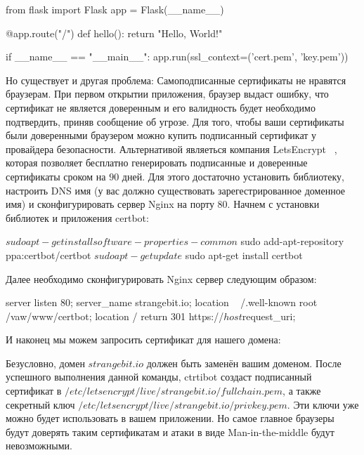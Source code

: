 \begin{python}
from flask import Flask
app = Flask(__name__)

@app.route("/")
def hello():
    return "Hello, World!"

if __name__ == "__main__":
    app.run(ssl_context=('cert.pem', 'key.pem'))
\end{python}

Но существует и другая проблема: Самоподписанные сертификаты не нравятся браузерам.
При первом открытии приложения, браузер выдаст ошибку, что сертификат не является
доверенным и его валидность будет необходимо подтвердить, приняв сообщение об угрозе.
Для того, чтобы ваши сертификаты были доверенными браузером можно купить подписанный 
сертификат у провайдера безопасности. Альтернативой являеться компания LetsEncrypt
~\cite{letsencrypt}, которая позволяет бесплатно генерировать подписанные и доверенные сертификаты
сроком на $90$ дней. Для этого достаточно установить библиотеку, настроить DNS
имя (у вас должно существовать зарегестрированное доменное имя) и сконфигурировать 
сервер Nginx на порту $80$. Начнем с установки библиотек и приложения certbot:

\begin{python}
$ sudo apt-get install software-properties-common
$ sudo add-apt-repository ppa:certbot/certbot
$ sudo apt-get update
$ sudo apt-get install certbot
\end{python}

Далее необходимо сконфигурировать Nginx сервер следующим образом:

\begin{python}
server {
    listen 80;
    server_name strangebit.io;
    location ~ /.well-known {
        root /vaw/www/certbot;
 	   }
    location / {
        return 301 https://$host$request_uri;
    }
}
\end{python}

И наконец мы можем запросить сертификат для нашего домена:


Безусловно, домен $strangebit.io$ должен быть заменён вашим доменом. После 
успешного выполнения данной команды, ctrtibot создаст подписанный сертификат в 
$/etc/letsencrypt/live/strangebit.io/fullchain.pem$, а также секретный ключ
$/etc/letsencrypt/live/strangebit.io/privkey.pem$. Эти ключи уже можно будет 
использовать в вашем приложении. Но самое главное браузеры будут доверять 
таким сертификатам и атаки в виде Man-in-the-middle будут невозможными.

